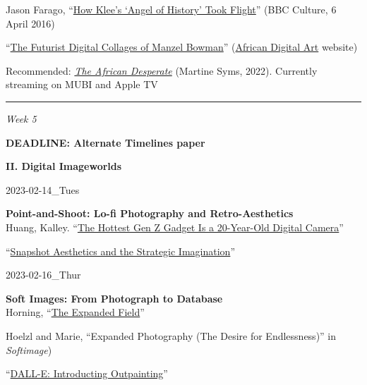 \documentclass[
  letterpaper,
  DIV=11,
  numbers=noendperiod]{scrartcl}
\begin{document}
Jason Farago,
``\href{https://www.bbc.com/culture/article/20160401-how-klees-angel-of-history-took-flight}{How
Klee's `Angel of History' Took Flight}'' (BBC Culture, 6 April 2016)

``\href{http://www.africandigitalart.com/2017/10/05/the-futurist-digital-collages-by-manzel-bowman/}{The
Futurist Digital Collages of Manzel Bowman}''
(\href{http://africandigitalart.com/}{African Digital Art} website)

Recommended:
\href{https://mubi.com/films/the-african-desperate}{\emph{The African
Desperate}} (Martine Syms, 2022). Currently streaming on MUBI and Apple
TV

\begin{center}\rule{0.5\linewidth}{0.5pt}\end{center}

\emph{Week 5}

\textbf{DEADLINE: Alternate Timelines paper}

\textbf{II. Digital Imageworlds}

2023-02-14\_Tues

\textbf{Point-and-Shoot: Lo-fi Photography and Retro-Aesthetics}\\
Huang, Kalley.
``\href{https://www.nytimes.com/2023/01/07/technology/digital-cameras-olympus-canon.html?fbclid=IwAR1X2DutHJgtJFKB6XdcFjbm3kFB9P-IXPT7HckeGErsOrk0jTVGxugXYzk\&referringSource=articleShare\&smid=nytcore-ios-share\&unlocked_article_code=AAAAAAAAAAAAAAAACEIPuonUktbfqIhkSVUbBCbJUNMnqBqCgvfeh7A9iX7iJSzQQj9Hwv4cGM2H_1bIfbd4ItA62TOdAt9dNbtlDNpD8thiBW0_AQ-5vsnD350fPyQ-rY_0Dm9qhMvBUL59-jTjPizkd7wmgezgtErDOzbvUaLc2CB2LF1isoIlIQ_xoQEAxqjPGuB009hsj7x2Vt0hG2B2NGTdtOLoCh5_JNyFchjZjwE8UOhdUjzQ9sWOv_NCKE4BTAKbEw4spDo0-9heO9kIPa7gLBZGeMv2gLoZD2cAP55OPFabG3prPPkN94E3_vHG}{The
Hottest Gen Z Gadget Is a 20-Year-Old Digital Camera}''

``\href{http://ivc.lib.rochester.edu/snapshot-aesthetics-and-the-strategic-imagination/}{Snapshot
Aesthetics and the Strategic Imagination}''

2023-02-16\_Thur

\textbf{Soft Images: From Photograph to Database}\\
Horning,
``\href{https://robhorning.substack.com/p/the-expanded-field}{The
Expanded Field}''

Hoelzl and Marie, ``Expanded Photography (The Desire for Endlessness)''
in \emph{Softimage})

``\href{https://openai.com/blog/dall-e-introducing-outpainting/}{DALL-E:
Introducting Outpainting}''
\end{document}
